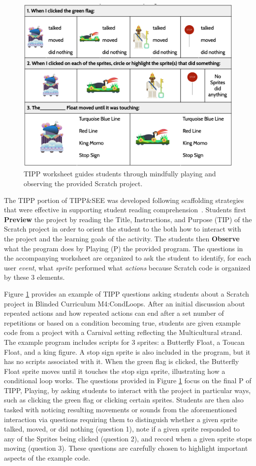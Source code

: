 \documentclass[sigconf,manuscript,review,anonymous]{acmart} %
\def\ts{TIPP\&SEE}
\newcommand{\Scratchencore}[0]{Blinded Curriculum}
\begin{document}
\begin{figure}[h]
    \centering
   \includegraphics[width=.6\linewidth]{examples/TIPP_Example.png}
    \caption{TIPP worksheet guides students through mindfully playing and observing the provided Scratch project.}
   \label{fig:tipp}
\end{figure}

The TIPP portion of \ts{} was developed following scaffolding strategies that were effective in supporting student reading comprehension~\cite{sharonv}. Students first \textbf{Preview} the project by reading the Title, Instructions, and Purpose (TIP) of the Scratch project in order to orient the student to the both how to interact with the project and the learning goals of the activity. The students then \textbf{Observe} what the program does by Playing (P) the provided program. The questions in the accompanying worksheet are organized to ask the student to identify, for each user \textit{event}, what \textit{sprite} performed what \textit{actions} because Scratch code is organized by these 3 elements. %

Figure \ref{fig:tipp} provides an example of TIPP questions asking students about a Scratch project in \Scratchencore{} M4:CondLoops. After an initial discussion about repeated actions and how repeated actions can end after a set number of repetitions or based on a condition becoming true, students are given example code from a project with a Carnival setting reflecting the Multicultural strand. The example program includes scripts for 3 sprites: a Butterfly Float, a Toucan Float, and a king figure. A stop sign sprite is also included in the program, but it has no scripts associated with it. When the green flag is clicked, the Butterfly Float sprite moves until it touches the stop sign sprite, illustrating how a conditional loop works. The questions provided in Figure \ref{fig:tipp} focus on the final P of TIPP, Playing, by asking students to interact with the project in particular ways, such as clicking the green flag or clicking certain sprites. Students are then also tasked with noticing resulting movements or sounds from the aforementioned interaction via questions requiring them to 
distinguish whether a given sprite talked, moved, or did nothing (question 1), note if a given sprite responded to any of the Sprites being clicked (question 2), and record when a given sprite stops moving (question 3). These questions are carefully chosen to highlight important aspects of the example code.
\end{document}

